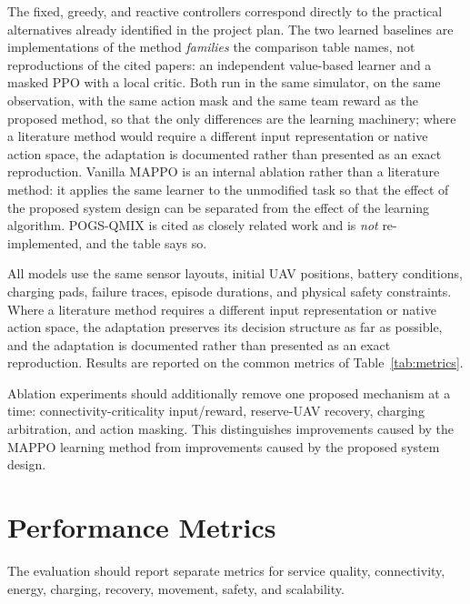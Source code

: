 \documentclass[conference]{IEEEtran}
\begin{document}
The fixed, greedy, and reactive controllers correspond directly to the practical alternatives already identified in the project plan. The two learned baselines are implementations of the method \emph{families} the comparison table names, not reproductions of the cited papers: an independent value-based learner and a masked PPO with a local critic. Both run in the same simulator, on the same observation, with the same action mask and the same team reward as the proposed method, so that the only differences are the learning machinery; where a literature method would require a different input representation or native action space, the adaptation is documented rather than presented as an exact reproduction. Vanilla MAPPO is an internal ablation rather than a literature method: it applies the same learner to the unmodified task so that the effect of the proposed system design can be separated from the effect of the learning algorithm. POGS-QMIX is cited as closely related work and is \emph{not} re-implemented, and the table says so.

All models use the same sensor layouts, initial UAV positions, battery conditions, charging pads, failure traces, episode durations, and physical safety constraints. Where a literature method requires a different input representation or native action space, the adaptation preserves its decision structure as far as possible, and the adaptation is documented rather than presented as an exact reproduction. Results are reported on the common metrics of Table~\ref{tab:metrics}.

Ablation experiments should additionally remove one proposed mechanism at a time: connectivity-criticality input/reward, reserve-UAV recovery, charging arbitration, and action masking. This distinguishes improvements caused by the MAPPO learning method from improvements caused by the proposed system design.

\section{Performance Metrics}
\label{sec:metrics}
The evaluation should report separate metrics for service quality, connectivity, energy, charging, recovery, movement, safety, and scalability.
\end{document}
